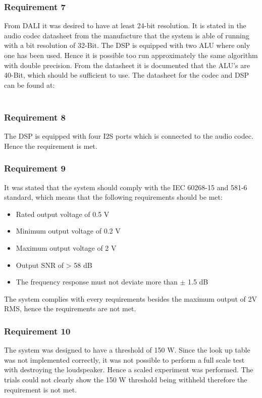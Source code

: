 \subsubsection*{Requirement 7}
From DALI it was desired to have at least 24-bit resolution. It is stated in the audio codec datasheet from the manufacture that the system is able of running with a bit resolution of 32-Bit. The DSP is equipped with two ALU where only one has been used. Hence it is possible too run approximately the same algorithm with double precision. From the datasheet it is documented that the ALU's are 40-Bit, which should be sufficient to use. The datasheet for the codec and DSP can be found at: \\
\\

 \vspace*{-5mm} 
\subsubsection*{Requirement 8}
The DSP is equipped with four I2S ports which is connected to the audio codec. Hence the requirement is met.

\vspace*{-5mm}
\subsubsection*{Requirement 9}

It was stated that the system should comply with the IEC 60268-15 and 581-6 standard, which means that the following requirements should be met:
\vspace*{-5mm}
\begin{itemize}\addtolength{\itemsep}{-.35\baselineskip} 
	\item Rated output voltage of 0.5 V
	\item Minimum output voltage of 0.2 V
	\item Maximum output voltage of 2 V
	\item Output SNR of > 58 dB
	\item The frequency response must not deviate more than $\pm$ 1.5 dB
\end{itemize}
\vspace*{-5mm}
The system complies with every requirements besides the maximum output of 2V RMS, hence the requirements are not met.


\subsubsection*{Requirement 10}
The system was designed to have a threshold of 150 W. Since the look up table was not implemented correctly, it was not possible to perform a full scale test with destroying the loudspeaker. Hence a scaled experiment was performed. The trials could not clearly show the 150 W threshold being withheld therefore the requirement is not met.
\vspace*{-5mm}
